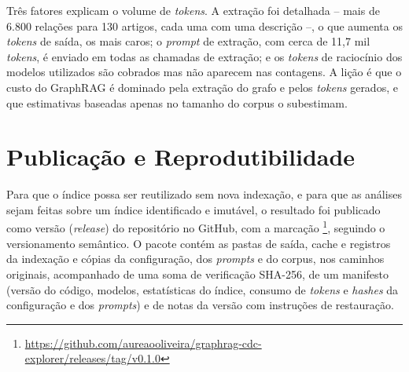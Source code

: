 Três fatores explicam o volume de \textit{tokens}. A extração foi detalhada -- mais de 6.800 relações para 130 artigos, cada uma com uma descrição --, o que aumenta os \textit{tokens} de saída, os mais caros; o \textit{prompt} de extração, com cerca de 11,7 mil \textit{tokens}, é enviado em todas as chamadas de extração; e os \textit{tokens} de raciocínio dos modelos utilizados são cobrados mas não aparecem nas contagens. A lição é que o custo do GraphRAG é dominado pela extração do grafo e pelos \textit{tokens} gerados, e que estimativas baseadas apenas no tamanho do corpus o subestimam.

\section{Publicação e Reprodutibilidade}
\label{sec-indexacao-release}

Para que o índice possa ser reutilizado sem nova indexação, e para que as análises sejam feitas sobre um índice identificado e imutável, o resultado foi publicado como versão (\textit{release}) do repositório no GitHub, com a marcação \footnote{\url{https://github.com/aureaooliveira/graphrag-cdc-explorer/releases/tag/v0.1.0}}, seguindo o versionamento semântico. O pacote contém as pastas de saída, cache e registros da indexação e cópias da configuração, dos \textit{prompts} e do corpus, nos caminhos originais, acompanhado de uma soma de verificação SHA-256, de um manifesto (versão do código, modelos, estatísticas do índice, consumo de \textit{tokens} e \textit{hashes} da configuração e dos \textit{prompts}) e de notas da versão com instruções de restauração.

